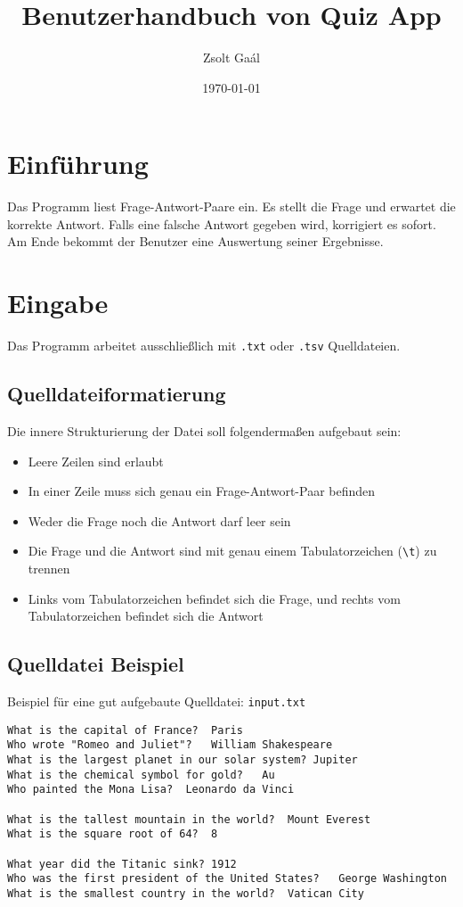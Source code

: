 \documentclass{article}
\title{Benutzerhandbuch von Quiz App}
\author{Zsolt Gaál}
\date{\today}
\begin{document}
\maketitle

\tableofcontents

\newpage

\section{Einführung}
Das Programm liest Frage-Antwort-Paare ein. Es stellt die Frage und erwartet die korrekte Antwort. Falls eine falsche Antwort gegeben wird, korrigiert es sofort. Am Ende bekommt der Benutzer eine Auswertung seiner Ergebnisse.

\section{Eingabe}

Das Programm arbeitet ausschließlich mit \texttt{.txt} oder \texttt{.tsv} Quelldateien. 

\subsection{Quelldateiformatierung}
Die innere Strukturierung der Datei soll folgendermaßen aufgebaut sein:

\begin{itemize}
    \item Leere Zeilen sind erlaubt
    \item In einer Zeile muss sich genau ein Frage-Antwort-Paar befinden
    \item Weder die Frage noch die Antwort darf leer sein
    \item Die Frage und die Antwort sind mit genau einem Tabulatorzeichen (\texttt{\textbackslash t}) zu trennen
    \item Links vom Tabulatorzeichen befindet sich die Frage, und rechts vom Tabulatorzeichen befindet sich die Antwort
\end{itemize}

\subsection{Quelldatei Beispiel}
Beispiel für eine gut aufgebaute Quelldatei: \texttt{input.txt}

\begin{lstlisting}
What is the capital of France?  Paris
Who wrote "Romeo and Juliet"?   William Shakespeare
What is the largest planet in our solar system? Jupiter
What is the chemical symbol for gold?   Au
Who painted the Mona Lisa?  Leonardo da Vinci

What is the tallest mountain in the world?  Mount Everest
What is the square root of 64?  8

What year did the Titanic sink? 1912
Who was the first president of the United States?   George Washington
What is the smallest country in the world?  Vatican City
\end{lstlisting}
\end{document}
